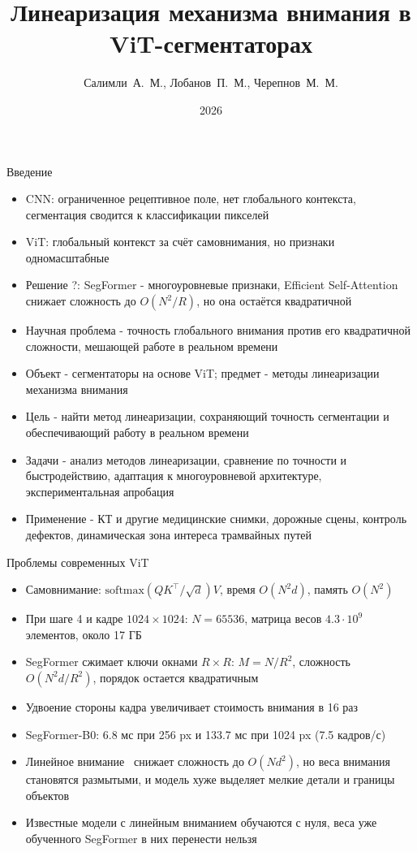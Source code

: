\documentclass[aspectratio=169,xcolor=table]{beamer}
\title[Линеаризация внимания в ViT-сегментаторах]{Линеаризация механизма внимания в ViT-сегментаторах}
\author[Салимли, Лобанов, Черепнов]{Салимли~А.~М., Лобанов~П.~М., Черепнов~М.~М.}
\institute[СПбПУ]{
  Санкт-Петербургский политехнический университет Петра Великого\\[2pt]
  Математика и компьютерные науки\\
  Искусственный интеллект и машинное обучение\\[2pt]
  гр.~5140201/60301
}
\date{2026}
\begin{document}
\begin{frame}
  \titlepage
\end{frame}

\begin{frame}{Введение}
  \small
  \begin{itemize}
    \item CNN: ограниченное рецептивное поле, нет глобального контекста, сегментация сводится к классификации пикселей
    \item ViT: глобальный контекст за счёт самовнимания, но признаки одномасштабные
    \item Решение ?: SegFormer - многоуровневые признаки, Efficient Self-Attention снижает сложность до $O(N^2/R)$, но она остаётся квадратичной
    \item Научная проблема - точность глобального внимания против его квадратичной сложности, мешающей работе в реальном времени
    \item Объект - сегментаторы на основе ViT; предмет - методы линеаризации механизма внимания
    \item Цель - найти метод линеаризации, сохраняющий точность сегментации и обеспечивающий работу в реальном времени
    \item Задачи - анализ методов линеаризации, сравнение по точности и быстродействию, адаптация к многоуровневой архитектуре, экспериментальная апробация
    \item Применение - КТ и другие медицинские снимки, дорожные сцены, контроль дефектов, динамическая зона интереса трамвайных путей~\cite{myarticle}
  \end{itemize}
\end{frame}

\begin{frame}{Проблемы современных ViT}
  \small
  \begin{itemize}
    \item Самовнимание: $\mathrm{softmax}\left(QK^{\top} / \sqrt{d}\right) V$, время $O(N^2 d)$, память $O(N^2)$
    \item При шаге 4 и кадре $1024 \times 1024$: $N = 65536$, матрица весов $4.3 \cdot 10^{9}$ элементов, около 17 ГБ
    \item SegFormer сжимает ключи окнами $R \times R$: $M = N / R^2$, сложность $O(N^2 d / R^2)$, порядок остается квадратичным
    \item Удвоение стороны кадра увеличивает стоимость внимания в 16 раз
    \item SegFormer-B0: 6.8 мс при 256 px и 133.7 мс при 1024 px (7.5 кадров/с)
    \item Линейное внимание~\cite{katharopoulos,flatten} снижает сложность до $O(N d^2)$, но веса внимания становятся размытыми, и модель хуже выделяет мелкие детали и границы объектов
    \item Известные модели с линейным вниманием обучаются с нуля, веса уже обученного SegFormer в них перенести нельзя
  \end{itemize}
\end{frame}
\end{document}
